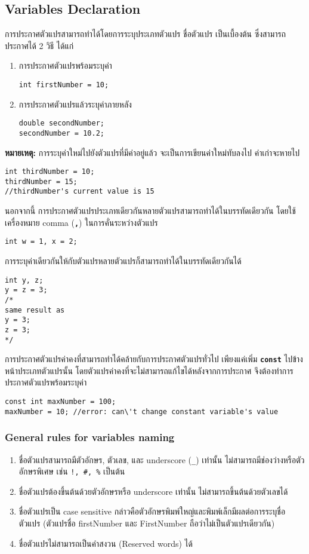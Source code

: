 \subsection{Variables Declaration}
การประกาศตัวแปรสามารถทำได้โดยการระบุประเภทตัวแปร ชื่อตัวแปร เป็นเบื้องต้น ซึ่งสามารถประกาศได้ 2 วิธี ได้แก่
\begin{enumerate}
\item การประกาศตัวแปรพร้อมระบุค่า
\begin{lstlisting}
int firstNumber = 10;
\end{lstlisting}
\item การประกาศตัวแปรแล้วระบุค่าภายหลัง
\begin{lstlisting}
double secondNumber;
secondNumber = 10.2;
\end{lstlisting}
\end{enumerate}
\textbf{หมายเหตุ:} การระบุค่าใหม่ไปยังตัวแปรที่มีค่าอยู่แล้ว จะเป็นการเขียนค่าใหม่ทับลงไป ค่าเก่าจะหายไป
\begin{lstlisting}
int thirdNumber = 10;
thirdNumber = 15;
//thirdNumber's current value is 15
\end{lstlisting}

นอกจากนี้ การประกาศตัวแปรประเภทเดียวกันหลายตัวแปรสามารถทำได้ในบรรทัดเดียวกัน โดยใช้เครื่องหมาย comma (\textbf{\texttt{,}}) ในการคั่นระหว่างตัวแปร
\begin{lstlisting}
int w = 1, x = 2;
\end{lstlisting}

การระบุค่าเดียวกันให้กับตัวแปรหลายตัวแปรก็สามารถทำได้ในบรรทัดเดียวกันได้
\begin{lstlisting}
int y, z;
y = z = 3;
/*
same result as
y = 3;
z = 3;
*/
\end{lstlisting}

การประกาศตัวแปรค่าคงที่สามารถทำได้คล้ายกับการประกาศตัวแปรทั่วไป เพียงแค่เพิ่ม \textbf{\texttt{const}} ไปข้างหน้าประเภทตัวแปรนั้น โดยตัวแปรค่าคงที่จะไม่สามารถแก้ไขได้หลังจากการประกาศ จึงต้องทำการประกาศตัวแปรพร้อมระบุค่า
\begin{lstlisting}
const int maxNumber = 100;
maxNumber = 10;	//error: can\'t change constant variable's value
\end{lstlisting}

\newpage
\subsubsection{General rules for variables naming}
\begin{enumerate}
\item ชื่อตัวแปรสามารถมีตัวอักษร, ตัวเลข, และ underscore (\texttt{\_}) เท่านั้น ไม่สามารถมีช่องว่างหรือตัวอักษรพิเศษ เช่น \texttt{!, \#, \%} เป็นต้น
\item ชื่อตัวแปรต้องขึ้นต้นด้วยตัวอักษรหรือ underscore เท่านั้น ไม่สามารถขึ้นต้นด้วยตัวเลขได้
\item ชื่อตัวแปรเป็น case sensitive กล่าวคือตัวอักษรพิมพ์ใหญ่และพิมพ์เล็กมีผลต่อการระบุชื่อตัวแปร (ตัวแปรชื่อ firstNumber และ FirstNumber ถือว่าไม่เป็นตัวแปรเดียวกัน)
\item ชื่อตัวแปรไม่สามารถเป็นคำสงวน (Reserved words) ได้
\end{enumerate}
